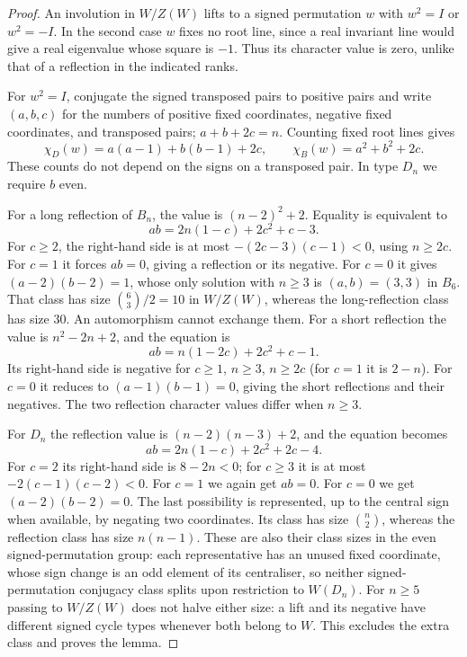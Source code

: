 \documentclass[11pt]{amsart}
\theoremstyle{definition}
\begin{document}
\begin{proof}
An involution in $W/Z(W)$ lifts to a signed permutation $w$ with $w^2=I$ or $w^2=-I$.
In the second case $w$ fixes no root line, since a real invariant line would give a real eigenvalue
whose square is $-1$. Thus its character value is zero, unlike that of a reflection in the indicated ranks.

For $w^2=I$, conjugate the signed transposed pairs to positive pairs and write $(a,b,c)$ for the numbers
of positive fixed coordinates, negative fixed coordinates, and transposed pairs; $a+b+2c=n$.
Counting fixed root lines gives
\[
 \chi_D(w)=a(a-1)+b(b-1)+2c,\qquad
 \chi_B(w)=a^2+b^2+2c.
\]
These counts do not depend on the signs on a transposed pair. In type $D_n$ we require $b$ even.

For a long reflection of $B_n$, the value is $(n-2)^2+2$. Equality is equivalent to
\[
 ab=2n(1-c)+2c^2+c-3.
\]
For $c\ge2$, the right-hand side is at most $-(2c-3)(c-1)<0$, using $n\ge2c$.
For $c=1$ it forces $ab=0$, giving a reflection or its negative. For $c=0$ it gives
$(a-2)(b-2)=1$, whose only solution with $n\ge3$ is $(a,b)=(3,3)$ in $B_6$.
That class has size $\binom63/2=10$ in $W/Z(W)$, whereas the long-reflection class has size $30$.
An automorphism cannot exchange them.
For a short reflection the value is $n^2-2n+2$, and the equation is
\[
 ab=n(1-2c)+2c^2+c-1.
\]
Its right-hand side is negative for $c\ge1$, $n\ge3$, $n\ge2c$ (for $c=1$ it is $2-n$).
For $c=0$ it reduces to $(a-1)(b-1)=0$, giving the short reflections and their negatives.
The two reflection character values differ when $n\ge3$.

For $D_n$ the reflection value is $(n-2)(n-3)+2$, and the equation becomes
\[
 ab=2n(1-c)+2c^2+2c-4.
\]
For $c=2$ its right-hand side is $8-2n<0$; for $c\ge3$ it is at most $-2(c-1)(c-2)<0$.
For $c=1$ we again get $ab=0$. For $c=0$ we get $(a-2)(b-2)=0$.
The last possibility is represented, up to the central sign when available, by negating two coordinates.
Its class has size $\binom n2$, whereas the reflection class has size $n(n-1)$.
These are also their class sizes in the even signed-permutation group: each representative has
an unused fixed coordinate, whose sign change is an odd element of its centraliser, so neither
signed-permutation conjugacy class splits upon restriction to $W(D_n)$.
For $n\ge5$ passing to $W/Z(W)$ does not halve either size: a lift and its negative have different
signed cycle types whenever both belong to $W$. This excludes the extra class and proves the lemma.
\end{proof}
\end{document}
